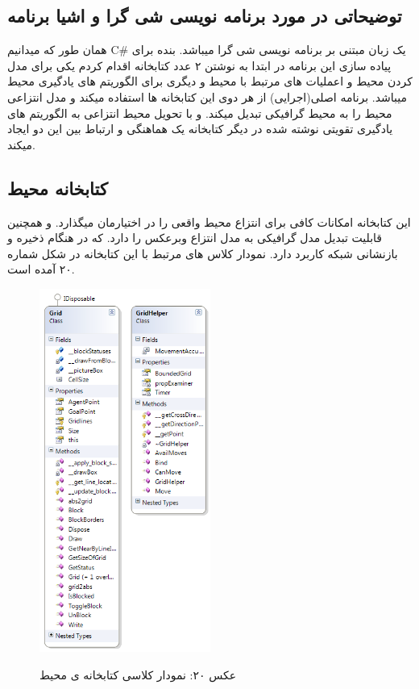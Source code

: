 \documentclass[10pt,a4paper]{article}
\begin{document}
\begin{Arabic}
\section{\textarabic{توضیحاتی در مورد برنامه نویسی شی گرا و اشیا برنامه}}
همان طور که میدانیم
\textenglish{C\#}
یک زبان مبتنی بر برنامه نویسی شی گرا میباشد. بنده برای پیاده سازی این برنامه در ابتدا به نوشتن ۲ عدد کتابخانه اقدام کردم یکی برای مدل کردن محیط و اعملیات های مرتبط با محیط و دیگری برای الگوریتم های یادگیری محیط میباشد. برنامه اصلی(اجرایی) از هر دوی این کتابخانه ها استفاده میکند و مدل انتزاعی محیط را به محیط گرافیکی تبدیل میکند. و با تحویل محیط انتزاعی به الگوریتم های یادگیری تقویتی نوشته شده در دیگر کتابخانه یک هماهنگی و ارتباط بین این دو ایجاد میکند.

\subsection{\textarabic{کتابخانه محیط}}
این کتابخانه امکانات کافی برای انتزاع محیط واقعی را در اختیارمان میگذارد. و همچنین قابلیت تبدیل مدل گرافیکی به مدل انتزاع وبرعکس را دارد. که در هنگام ذخیره و بازنشانی شبکه کاربرد دارد. نمودار کلاس های مرتبط با این کتابخانه در شکل شماره ۲۰ آمده است.

\begin{figure}[H]
    \centering
    \includegraphics[width=0.5\textwidth]{diag-env}
    \begin{center}
    \textarabic{عکس ۲۰: نمودار کلاسی کتابخانه ی محیط}
    \end{center}
\end{figure}


\end{Arabic}
\end{document}
